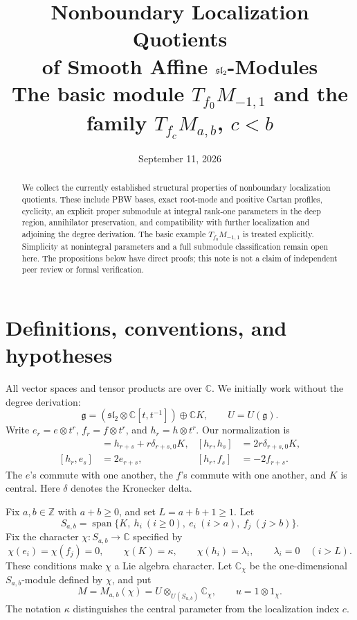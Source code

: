 \documentclass[11pt,a4paper]{article}
\title{\vspace{-14mm}Nonboundary Localization Quotients\\
of Smooth Affine \(\slc\)-Modules\\[3pt]
\large The basic module \(T_{f_0}M_{-1,1}\) and the family \(T_{f_c}M_{a,b}\), \(c<b\)}
\author{}
\date{September 11, 2026}
\newcommand{\C}{\mathbb C}
\newcommand{\Z}{\mathbb Z}
\newcommand{\g}{\mathfrak g}
\newcommand{\slc}{\mathfrak{sl}_2}
\newcommand{\Span}{\operatorname{span}}
\theoremstyle{plainupright}
\begin{document}
\maketitle
\vspace{-9mm}
\begin{abstract}
We collect the currently established structural properties of nonboundary
localization quotients. These include PBW bases, exact root-mode and positive
Cartan profiles, cyclicity, an explicit proper submodule at integral rank-one
parameters in the deep region, annihilator preservation, and compatibility
with further localization and adjoining the degree derivation.
The basic example \(T_{f_0}M_{-1,1}\) is treated explicitly.
Simplicity at nonintegral parameters and a full submodule classification remain
open here. The propositions below have direct proofs; this note is not a claim
of independent peer review or formal verification.
\end{abstract}

\section{Definitions, conventions, and hypotheses}

All vector spaces and tensor products are over \(\C\). We initially work
without the degree derivation:
\[
\g=(\slc\otimes\C[t,t^{-1}])\oplus\C K,\qquad U=U(\g).
\]
Write \(e_r=e\otimes t^r\), \(f_r=f\otimes t^r\), and \(h_r=h\otimes t^r\).
Our normalization is
\begin{align*}
[e_r,f_s]&=h_{r+s}+r\delta_{r+s,0}K,&
[h_r,h_s]&=2r\delta_{r+s,0}K,\\
[h_r,e_s]&=2e_{r+s},&
[h_r,f_s]&=-2f_{r+s}.
\end{align*}
The \(e\)'s commute with one another, the \(f\)'s commute with one another,
and \(K\) is central. Here \(\delta\) denotes the Kronecker delta.

Fix \(a,b\in\Z\) with \(a+b\ge0\), and set \(L=a+b+1\ge1\). Let
\[
S_{a,b}=\Span\{K,\ h_i\ (i\ge0),\ e_i\ (i>a),\ f_j\ (j>b)\}.
\]
Fix the character \(\chi:S_{a,b}\to\C\) specified by
\[
\chi(e_i)=\chi(f_j)=0,\qquad
\chi(K)=\kappa,\qquad \chi(h_i)=\lambda_i,\qquad
\lambda_i=0\quad(i>L).
\]
These conditions make \(\chi\) a Lie algebra character.
Let \(\C_\chi\) be the one-dimensional \(S_{a,b}\)-module defined by \(\chi\), and put
\[
M=M_{a,b}(\chi)=U\otimes_{U(S_{a,b})}\C_\chi,\qquad u=1\otimes1_\chi.
\]
The notation \(\kappa\) distinguishes the central parameter from the
localization index \(c\).
\end{document}
